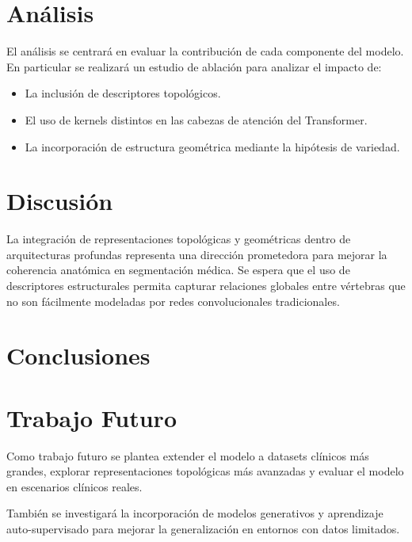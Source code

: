 \documentclass[conference]{IEEEtran}
\begin{document}
\section{Análisis}

El análisis se centrará en evaluar la contribución de cada componente del modelo. En particular se realizará un estudio de ablación para analizar el impacto de:

\begin{itemize}

\item La inclusión de descriptores topológicos.

\item El uso de kernels distintos en las cabezas de atención del Transformer.

\item La incorporación de estructura geométrica mediante la hipótesis de variedad.

\end{itemize}
\section{Discusión}

La integración de representaciones topológicas y geométricas dentro de arquitecturas profundas representa una dirección prometedora para mejorar la coherencia anatómica en segmentación médica. Se espera que el uso de descriptores estructurales permita capturar relaciones globales entre vértebras que no son fácilmente modeladas por redes convolucionales tradicionales.
\section{Conclusiones}
\section{Trabajo Futuro}

Como trabajo futuro se plantea extender el modelo a datasets clínicos más grandes, explorar representaciones topológicas más avanzadas y evaluar el modelo en escenarios clínicos reales.

También se investigará la incorporación de modelos generativos y aprendizaje auto-supervisado para mejorar la generalización en entornos con datos limitados.
\nocite{*}


\end{document}
